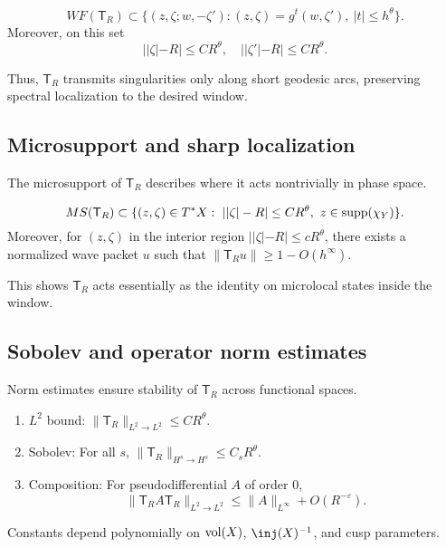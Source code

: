 \begin{theorem}\label{thm:wavefront}
\[
WF(\mathsf{T}_R) \subset \{(z,\zeta;w,-\zeta') : (z,\zeta)=g^t(w,\zeta'),\ |t|\leq h^\theta\}.
\]
Moreover, on this set
\[
||\zeta|-R|\leq CR^\theta,\quad ||\zeta'|-R|\leq CR^\theta.
\]
\end{theorem}

Thus, $\mathsf{T}_R$ transmits singularities only along short geodesic arcs, preserving spectral localization to the desired window.

\subsection{Microsupport and sharp localization}\label{subsec:micro-support}

The microsupport of $\mathsf{T}_R$ describes where it acts nontrivially in phase space.

\begin{proposition}[Microsupport]\label{prop:microsupport}
\[
MS(\mathsf{T}_R) \subset \{(z,\zeta)\in T^*X:\ ||\zeta|-R|\leq CR^\theta,\ z\in\supp(\chi_Y)\}.
\]
Moreover, for $(z,\zeta)$ in the interior region $||\zeta|-R|\leq cR^\theta$, there exists a normalized wave packet $u$ such that $\|\mathsf{T}_R u\|\geq 1-O(h^\infty)$.
\end{proposition}

This shows $\mathsf{T}_R$ acts essentially as the identity on microlocal states inside the window.

\subsection{Sobolev and operator norm estimates}\label{subsec:micro-sobolev}

Norm estimates ensure stability of $\mathsf{T}_R$ across functional spaces.

\begin{theorem}\label{thm:norm-estimates}
\begin{enumerate}
\item $L^2$ bound: $\|\mathsf{T}_R\|_{L^2\to L^2}\leq CR^\theta$.
\item Sobolev: For all $s$, $\|\mathsf{T}_R\|_{H^s\to H^s}\leq C_s R^\theta$.
\item Composition: For pseudodifferential $A$ of order 0,
\[
\|\mathsf{T}_R A \mathsf{T}_R\|_{L^2\to L^2}\leq \|A\|_{L^\infty}+O(R^{-\varepsilon}).
\]
\end{enumerate}
Constants depend polynomially on $\operatorname{vol}(X)$, $\inj(X)^{-1}$, and cusp parameters.
\end{theorem}

